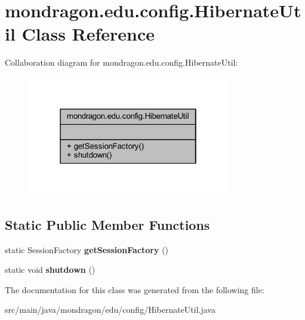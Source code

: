 \hypertarget{classmondragon_1_1edu_1_1config_1_1_hibernate_util}{}\section{mondragon.\+edu.\+config.\+Hibernate\+Util Class Reference}
\label{classmondragon_1_1edu_1_1config_1_1_hibernate_util}


Collaboration diagram for mondragon.\+edu.\+config.\+Hibernate\+Util\+:\nopagebreak
\begin{figure}[H]
\begin{center}
\leavevmode
\includegraphics[width=250pt]{classmondragon_1_1edu_1_1config_1_1_hibernate_util__coll__graph}
\end{center}
\end{figure}
\subsection*{Static Public Member Functions}
\begin{DoxyCompactItemize}
\item 
\mbox{\label{classmondragon_1_1edu_1_1config_1_1_hibernate_util_aa4aa6f6e584769315a31563e651d3d05}} 
static Session\+Factory {\bfseries get\+Session\+Factory} ()
\item 
\mbox{\label{classmondragon_1_1edu_1_1config_1_1_hibernate_util_ae4dd0bd0ca997f1ca21a82d809da43d2}} 
static void {\bfseries shutdown} ()
\end{DoxyCompactItemize}


The documentation for this class was generated from the following file\+:\begin{DoxyCompactItemize}
\item 
src/main/java/mondragon/edu/config/Hibernate\+Util.\+java\end{DoxyCompactItemize}
